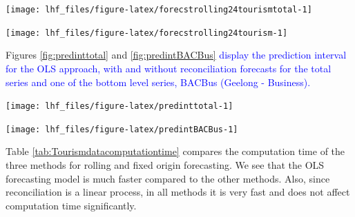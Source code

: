 \documentclass[11pt,a4paper,]{article}
\let\origfigure\figure
\let\endorigfigure\endfigure
\renewenvironment{figure}[1][2] {
    \expandafter\origfigure\expandafter[!htbp]
} {
    \endorigfigure
}
\begin{document}
\begin{figure}

{\centering \texttt{[image: lhf\_files/figure-latex/forecstrolling24tourismtotal-1]} 

}

\caption{The actual test set for the 'Total series' compared to the forecasts from reconciled and unreconciled ETS, ARIMA and OLS methods for rolling and fixed origin tourism demand.}\label{fig:forecstrolling24tourismtotal}
\end{figure}

\begin{figure}

{\centering \texttt{[image: lhf\_files/figure-latex/forecstrolling24tourism-1]} 

}

\caption{The actual test set for the 'BACBus' bottom level series compared to the forecasts from reconciled and unreconciled ETS, ARIMA and OLS methods for rolling and fixed origin tourism demand.}\label{fig:forecstrolling24tourism}
\end{figure}

Figures \ref{fig:predinttotal} and \ref{fig:predintBACBus} \textcolor{blue}{display the prediction interval for the OLS approach, with and without reconciliation forecasts for the total series and one of the bottom level series, BACBus (Geelong - Business).}

\begin{figure}

{\centering \texttt{[image: lhf\_files/figure-latex/predinttotal-1]} 

}

\caption{The actual test set for the 'Total series' compared to the forecasts from reconciled and unreconciled OLS methods with prediction interval for fixed origin tourism demand.}\label{fig:predinttotal}
\end{figure}

\begin{figure}

{\centering \texttt{[image: lhf\_files/figure-latex/predintBACBus-1]} 

}

\caption{The actual test set for the 'BACBus' bottom level series compared to the forecasts from reconciled and unreconciled OLS methods with prediction interval for fixed origin tourism demand.}\label{fig:predintBACBus}
\end{figure}

Table \ref{tab:Tourismdatacomputationtime} compares the computation time of the three methods for rolling and fixed origin forecasting. We see that the OLS forecasting model is much faster compared to the other methods. Also, since reconciliation is a linear process, in all methods it is very fast and does not affect computation time significantly.
\end{document}
